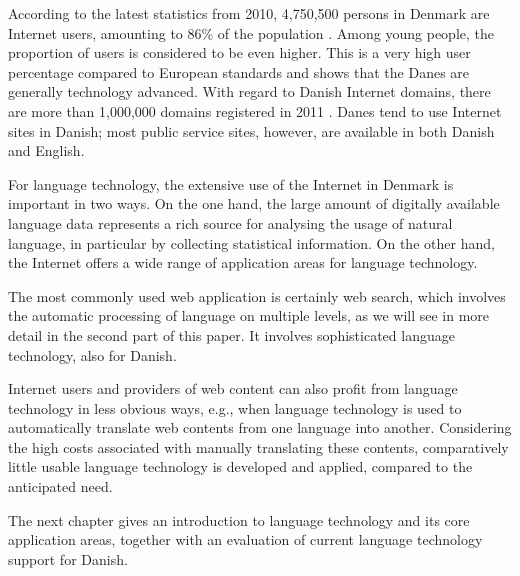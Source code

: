 \begin{multicols}{2}
 According to the latest statistics from 2010, 4,750,500 persons in Denmark are Internet users, amounting to 86\% of the population \cite{worldstats}.  Among young people, the proportion of users is considered to be even higher. This is a very high user percentage compared to European standards and shows that the Danes are generally technology advanced. With regard to Danish Internet domains, there are more than 1,000,000 domains registered in 2011 \cite{hostmaster}. Danes tend to use Internet sites in Danish; most public service sites, however, are available in both Danish and English.

 
For language technology, the extensive use of the Internet in Denmark is important in two ways. On the one hand, the large amount of digitally available language data represents a rich source for analysing the usage of natural language, in particular by collecting statistical information. On the other hand, the Internet offers a wide range of application areas for language technology. 

The most commonly used web application is certainly web search, which involves the automatic processing of language on multiple levels, as we will see in more detail in the second part of this paper. It involves sophisticated language technology, also for Danish.  

Internet users and providers of web content can also profit from language technology in less obvious ways, e.g., when language technology is used to automatically translate web contents from one language into another. Considering the high costs associated with manually translating these contents, comparatively little usable language technology is developed and applied, compared to the anticipated need.

The next chapter gives an introduction to language technology and its core application areas, together with an evaluation of current language technology support for Danish.
\end{multicols}

\clearpage


